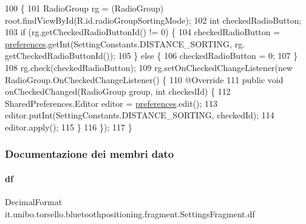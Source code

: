 \begin{DoxyCode}
100                                        \{
101         RadioGroup rg = (RadioGroup) root.findViewById(R.id.radioGroupSortingMode);
102         \textcolor{keywordtype}{int} checkedRadioButton;
103         \textcolor{keywordflow}{if} (rg.getCheckedRadioButtonId() != 0) \{
104             checkedRadioButton = \hyperlink{classit_1_1unibo_1_1torsello_1_1bluetoothpositioning_1_1fragment_1_1SettingsFragment_a52480c4d5d81ca59fe4a98ae3c623ea4_a52480c4d5d81ca59fe4a98ae3c623ea4}{preferences}.getInt(SettingConstants.DISTANCE\_SORTING, rg.
      getCheckedRadioButtonId());
105         \} \textcolor{keywordflow}{else} \{
106             checkedRadioButton = 0;
107         \}
108         rg.check(checkedRadioButton);
109         rg.setOnCheckedChangeListener(\textcolor{keyword}{new} RadioGroup.OnCheckedChangeListener() \{
110             @Override
111             \textcolor{keyword}{public} \textcolor{keywordtype}{void} onCheckedChanged(RadioGroup group, \textcolor{keywordtype}{int} checkedId) \{
112                 SharedPreferences.Editor editor = \hyperlink{classit_1_1unibo_1_1torsello_1_1bluetoothpositioning_1_1fragment_1_1SettingsFragment_a52480c4d5d81ca59fe4a98ae3c623ea4_a52480c4d5d81ca59fe4a98ae3c623ea4}{preferences}.edit();
113                 editor.putInt(SettingConstants.DISTANCE\_SORTING, checkedId);
114                 editor.apply();
115             \}
116         \});
117     \}
\end{DoxyCode}


\subsubsection{Documentazione dei membri dato}
\hypertarget{classit_1_1unibo_1_1torsello_1_1bluetoothpositioning_1_1fragment_1_1SettingsFragment_af6b80a700dc80c39a56d001b68a47694_af6b80a700dc80c39a56d001b68a47694}{}\label{classit_1_1unibo_1_1torsello_1_1bluetoothpositioning_1_1fragment_1_1SettingsFragment_af6b80a700dc80c39a56d001b68a47694_af6b80a700dc80c39a56d001b68a47694} 
\paragraph{\texorpdfstring{df}{df}}
{\footnotesize\ttfamily Decimal\+Format it.\+unibo.\+torsello.\+bluetoothpositioning.\+fragment.\+Settings\+Fragment.\+df\hspace{0.3cm}{\ttfamily [private]}}

